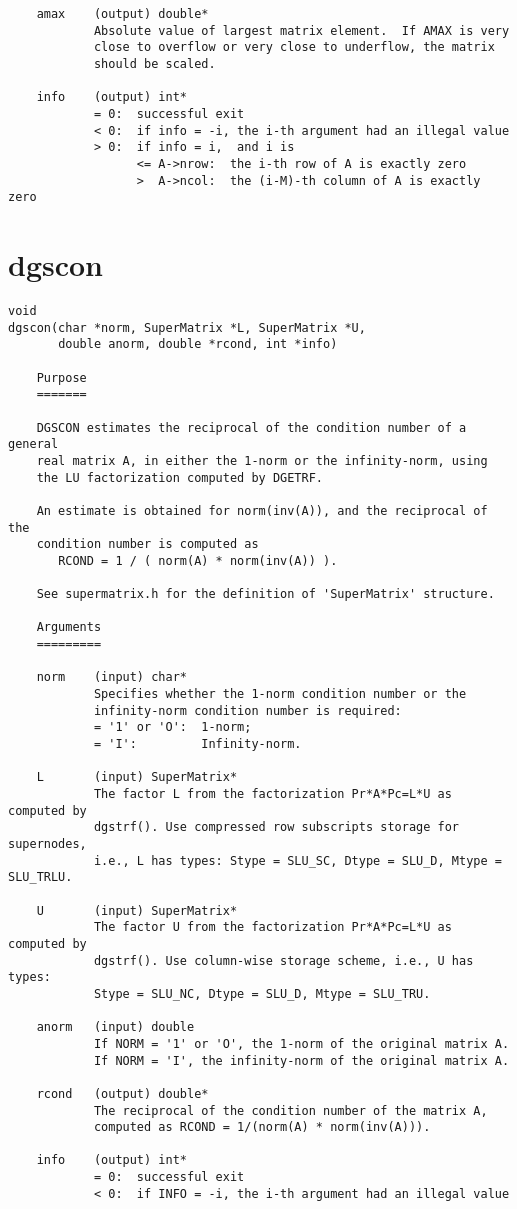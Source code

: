 \begin{verbatim}
    amax    (output) double*
            Absolute value of largest matrix element.  If AMAX is very   
            close to overflow or very close to underflow, the matrix   
            should be scaled.
	    
    info    (output) int*
            = 0:  successful exit   
            < 0:  if info = -i, the i-th argument had an illegal value   
            > 0:  if info = i,  and i is   
                  <= A->nrow:  the i-th row of A is exactly zero   
                  >  A->ncol:  the (i-M)-th column of A is exactly zero

\end{verbatim}

\section{dgscon}
\begin{verbatim}
void
dgscon(char *norm, SuperMatrix *L, SuperMatrix *U,
       double anorm, double *rcond, int *info)

    Purpose   
    =======   

    DGSCON estimates the reciprocal of the condition number of a general 
    real matrix A, in either the 1-norm or the infinity-norm, using   
    the LU factorization computed by DGETRF.   

    An estimate is obtained for norm(inv(A)), and the reciprocal of the   
    condition number is computed as   
       RCOND = 1 / ( norm(A) * norm(inv(A)) ).   

    See supermatrix.h for the definition of 'SuperMatrix' structure.
 
    Arguments   
    =========   

    norm    (input) char*
            Specifies whether the 1-norm condition number or the   
            infinity-norm condition number is required:   
            = '1' or 'O':  1-norm;   
            = 'I':         Infinity-norm.
	    
    L       (input) SuperMatrix*
            The factor L from the factorization Pr*A*Pc=L*U as computed by
            dgstrf(). Use compressed row subscripts storage for supernodes,
            i.e., L has types: Stype = SLU_SC, Dtype = SLU_D, Mtype = SLU_TRLU.
 
    U       (input) SuperMatrix*
            The factor U from the factorization Pr*A*Pc=L*U as computed by
            dgstrf(). Use column-wise storage scheme, i.e., U has types:
            Stype = SLU_NC, Dtype = SLU_D, Mtype = SLU_TRU.
	    
    anorm   (input) double
            If NORM = '1' or 'O', the 1-norm of the original matrix A.   
            If NORM = 'I', the infinity-norm of the original matrix A.
	    
    rcond   (output) double*
            The reciprocal of the condition number of the matrix A,   
            computed as RCOND = 1/(norm(A) * norm(inv(A))).
	    
    info    (output) int*
            = 0:  successful exit   
            < 0:  if INFO = -i, the i-th argument had an illegal value   

\end{verbatim}


